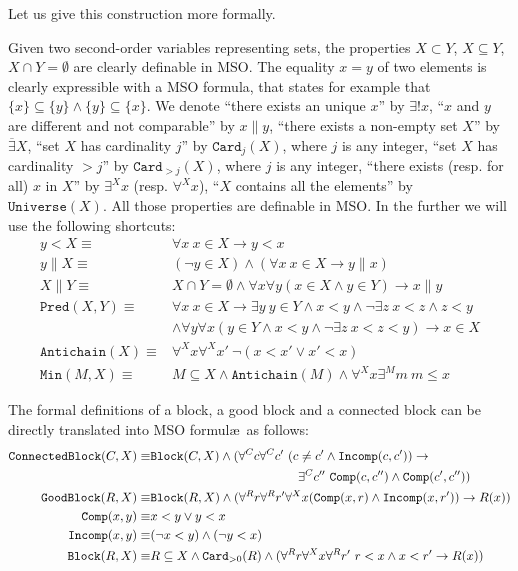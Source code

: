 \documentclass{CSML}
\begin{document}
Let us give this construction more formally.

Given two second-order variables representing sets, the  properties
$X\subset Y$,  $X\subseteq Y$, $X\cap Y=\emptyset$
are clearly definable in MSO.
The equality $x=y$ of two elements is clearly expressible with a MSO formula, that states for example that $\{x\}\subseteq\{y\}\land \{y\}\subseteq\{x\}$.
We denote 
``there exists an unique $x$'' by $\exists!x$, 
``$x$ and $y$ are different and not comparable'' by $x\parallel y$,
``there exists a non-empty set $X$'' by $\overline{\exists} X$,
``set $X$ has cardinality $j$'' by $\texttt{Card}_j(X)$, where $j$ is any integer,
``set $X$ has cardinality $>j$'' by $\texttt{Card}_{>j}(X)$, where $j$ is any integer,
``there exists (resp. for all) $x$ in $X$'' by $\exists^X x$ (resp. $\forall^X x$),
``$X$ contains all the elements'' by $\texttt{Universe}(X)$.
All those properties are definable in MSO.
In the further we will use the following shortcuts:
\begin{align*}
  y<X\equiv& \forall x\ x\in X\rightarrow y<x\\
  y\parallel X\equiv& (\lnot y\in X)\land(\forall x\ x\in X\rightarrow y\parallel x)\\
  X\parallel Y\equiv& X\cap Y=\emptyset\land\forall x\forall y (x\in X\land y\in Y)\rightarrow x\parallel y\\
  \texttt{Pred}(X,Y)\equiv&\forall x\ x\in X\rightarrow\exists y\ y\in Y\land x<y\land\lnot\exists z\ x<z\land z<y\\
  &\land\forall y\forall x( y\in Y\land x<y\land\lnot\exists z\ x<z<y )\rightarrow x\in X\\
  \texttt{Antichain}(X)\equiv&\forall^X x\forall^X x'\ \lnot(x<x'\lor x'<x)\\
  \texttt{Min}(M,X)\equiv&M\subseteq X\land \texttt{Antichain}(M)\land\forall^X x\exists^M m\ m\leq x                 
\end{align*}

\noindent The formal definitions of a block, a good block and a connected block can be directly translated into MSO formul{\ae}\ as follows:
 \begin{align*}
   \texttt{ConnectedBlock}(C,X)\equiv& \texttt{Block}(C,X)\land(\forall^C c\forall^C c'\ (c\not=c'\land\texttt{Incomp}(c,c')) \rightarrow\\&\ \hskip4cm\exists^C c''\ \texttt{Comp}(c,c'')\land\texttt{Comp}(c',c''))\\    
   \texttt{GoodBlock}(R,X)\equiv&
   \texttt{Block}(R,X)\land
   (\forall^R r\forall^R r'\forall^X x (\texttt{Comp}(x,r)\land\texttt{Incomp}(x,r'))\rightarrow R(x))\\
   \texttt{Comp}(x,y)\equiv& x<y\lor y<x\\
   \texttt{Incomp}(x,y)\equiv& (\lnot x<y)\land(\lnot y<x)\\
   \texttt{Block}(R,X)\equiv&R\subseteq X\land\texttt{Card}_{>0}(R)\land(\forall^R r\forall^X x\forall^R r'\ r<x\land x<r'\rightarrow R(x))
 \end{align*}\smallskip
\end{document}
